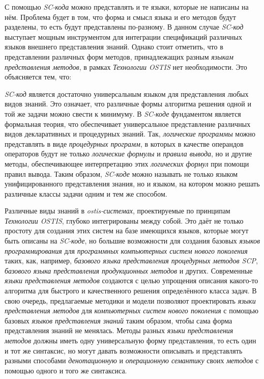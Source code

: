 С помощью \textit{SC-кода} можно представлять и те языки, которые не написаны на нём. Проблема будет в том, что форма и смысл языка и его методов будут разделены, то есть будут представлены по-разному. В данном случае \textit{SC-код} выступает мощным инструментом для интеграции спецификаций различных языков внешнего представления знаний. Однако стоит отметить, что в представлении различных форм методов, принадлежащих разным \textit{языкам представления методов}, в рамках \textit{Технологии OSTIS} нет необходимости. Это объясняется тем, что:
\begin{textitemize}
    \item \textit{SC-код} является достаточно универсальным языком для представления любых видов знаний. Это означает, что различные формы алгоритма решения одной и той же задачи можно свести к минимуму. В \textit{SC-коде} фундаментом является формальная теория, что обеспечивает универсальное представление различных видов декларативных и процедурных знаний. Так, \textit{логические программы} можно представлять в виде \textit{процедурных программ}, в которых в качестве операндов операторов будут не только \textit{логические формулы} и \textit{правила вывода}, но и другие методы, обеспечивающее интерпретацию этих \textit{логических формул} при помощи правил вывода. Таким образом, \textit{SC-коде} можно называть не только языком унифицированного представления знания, но и языком, на котором можно решать различные классы задачи одним и тем же способом.
    \item Различные виды знаний в \textit{ostis-системах}, проектируемые по принципам \textit{Технологии OSTIS}, глубоко интегрированы между собой. Это даёт не только простоту для создания этих систем на базе имеющихся языков, которые могут быть описаны на \textit{SC-коде}, но большие возможности для создания базовых \textit{языков программирования} для \textit{программных компьютерных систем нового поколения} таких, как, например, \textit{базового языка представления процедурных методов SCP}, \textit{базового языка представления продукционных методов} и других. Современные \textit{языки представления методов} создаются с целью упрощения описания какого-то алгоритма для быстрого и качественного решения определённого класса задач. В свою очередь, предлагаемые методики и модели позволяют проектировать \textit{языки представления методов} для \textit{компьютерных систем нового поколения} с помощью базовых \textit{языков представления знаний} таким образом, чтобы сама форма представления знаний не менялась. Методы разных \textit{языки представления методов} должны иметь одну универсальную форму представления, то есть один и тот же синтаксис, но могут давать возможности описывать и представлять разными способами \textit{денотационную} и \textit{операционную семантику} своих \textit{методов} с помощью одного и того же синтаксиса.

\end{textitemize}
